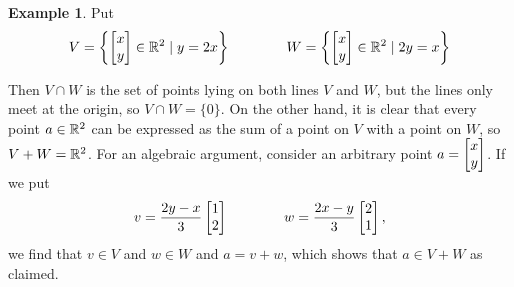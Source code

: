 \documentclass[reqno]{amsart}
\theoremstyle{definition}
\newtheorem{example}[theorem]{Example}
\begin{document}
\begin{example}\label{eg-sum-meet-i}
 Put
 \[ V = \left\{\left[\begin{matrix} x\\ y\end{matrix}\right]\in{\mathbb{R}}^2\;|\; y=2x\right\} \hspace{4em}
    W = \left\{\left[\begin{matrix} x\\ y\end{matrix}\right]\in{\mathbb{R}}^2\;|\; 2y=x\right\}
 \]

 \bigskip

 \begin{center}
 \end{center}
 Then $V\cap W$ is the set of points lying on both lines $V$ and $W$, but the
 lines only meet at the origin, so $V\cap W=\{0\}$.  On the other hand,
 it is clear that every point $a\in{\mathbb{R}}^2$ can be expressed as the sum
 of a point on $V$ with a point on $W$, so $V+W={\mathbb{R}}^2$.  For an
 algebraic argument, consider an arbitrary point $a=\left[\begin{matrix} x\\y \end{matrix}\right]$.
 If we put
 \[ v = \frac{2y-x}{3}\left[\begin{matrix} 1\\ 2\end{matrix}\right] \hspace{4em}
    w = \frac{2x-y}{3}\left[\begin{matrix} 2\\ 1\end{matrix}\right],
 \]
 we find that $v\in V$ and $w\in W$ and $a=v+w$, which shows that
 $a\in V+W$ as claimed.
\end{example}
\end{document}
